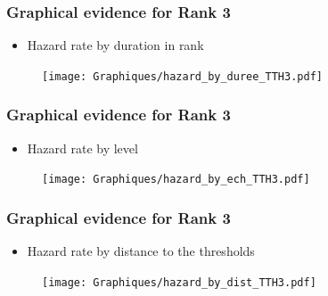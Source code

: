 \documentclass[xcolor=table,ignorenonframetext,12pt]{beamer}
\begin{document}
\begin{frame}
\frametitle{Graphical evidence for Rank 3}
\begin{itemize}
\item Hazard rate by duration in rank
\end{itemize}
\vspace{-0.2cm}
\begin{center}
\begin{figure}
\texttt{[image: Graphiques/hazard\_by\_duree\_TTH3.pdf]}
\end{figure}
\end{center}
\end{frame}

\begin{frame}
\frametitle{Graphical evidence for Rank 3}
\begin{itemize}
\item Hazard rate by level
\end{itemize}
\vspace{-0.2cm}
\begin{center}
\begin{figure}
\texttt{[image: Graphiques/hazard\_by\_ech\_TTH3.pdf]}
\end{figure}
\end{center}

\end{frame}
\begin{frame}
\frametitle{Graphical evidence for Rank 3}
\begin{itemize}
\item Hazard rate by distance to the thresholds
\end{itemize}
\vspace{-0.2cm}
\begin{center}
\begin{figure}
\texttt{[image: Graphiques/hazard\_by\_dist\_TTH3.pdf]}
\end{figure}
\end{center}

\end{frame}
\end{document}
